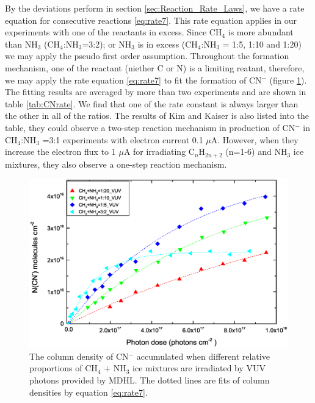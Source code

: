By the deviations perform in section \ref{sec:Reaction_Rate_Laws}, we have a rate equation for consecutive reactions \ref{eq:rate7}. This rate equation applies in our experiments with one of the reactants in excess. Since CH$_4$ is more abundant than NH$_3$ (CH$_4$:NH$_3$=3:2); or NH$_3$ is in excess (CH$_4$:NH$_3$ = 1:5, 1:10 and 1:20) we may apply the pseudo first order assumption. Throughout the formation mechanism, one of the reactant (niether C or N) is a limiting reatant, therefore, we may apply the rate equation \ref{eq:rate7} to fit the formation of CN$^-$ (figure \ref{fig:CNrate}).\\

The fitting results are averaged by more than two experiments and are shown in table \ref{tab:CNrate}. We find that one of the rate constant is always larger than the other in all of the ratios. The results of Kim and Kaiser is also listed into the table, they could observe a two-step reaction mechanism in production of CN$^-$ in CH$_4$:NH$_3$ =3:1 experiments with electron current 0.1 $\mu$A. However, when they increase the electron flux to 1 $\mu$A for irradiating C$_n$H$_{2n+2}$ (n=1-6) and NH$_3$ ice mixtures, they also observe a one-step reaction mechanism.\\

\begin{figure}
\centering
\includegraphics[width=\textwidth]{figures/chapter3/Overall_CN_rate.eps}
\caption{The column density of CN$^-$ accumulated when different relative proportions of CH$_4$ + NH$_3$ ice mixtures are irradiated by VUV photons provided by MDHL. The dotted lines are fits of column densities by equation \ref{eq:rate7}.}
\label{fig:CNrate}
\end{figure}

